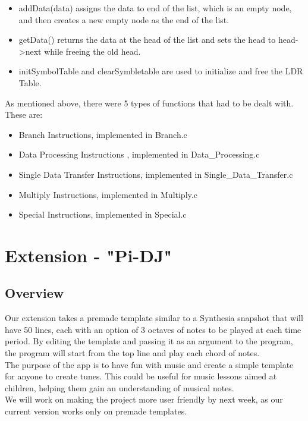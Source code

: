 \documentclass[11pt]{article}
\begin{document}
\begin{itemize}
\item addData(data) assigns the data to end of the list, which is an empty node, and then creates a new empty node as the end of the list.
\item getData() returns the data at the head of the list and sets the head to head->next while freeing the old head.
\item initSymbolTable and clearSymbletable are used to initialize and free the LDR Table.
\end{itemize}
As mentioned above, there were 5 types of functions that had to be dealt with. These are:
\begin{itemize}
\item Branch Instructions, implemented in Branch.c
\item Data Processing Instructions , implemented in Data\_Processing.c
\item Single Data Transfer Instructions, implemented in Single\_Data\_Transfer.c
\item Multiply Instructions, implemented in Multiply.c
\item Special Instructions, implemented in Special.c

\end{itemize}

\section{Extension - "Pi-DJ"}
\subsection{Overview}
Our extension takes a premade template similar to a Synthesia snapshot that will have 50 lines, each with an option of 3 octaves of notes to be played at each time period. By editing the template and passing it as an argument to the program, the program will start from the top line and play each chord of notes. \\
The purpose of the app is to have fun with music and create a simple template for anyone to create tunes. This could be useful for music lessons aimed at children, helping them gain an understanding of musical notes.\\
We will work on making the project more user friendly by next week, as our current version works only on premade templates.
\end{document}
